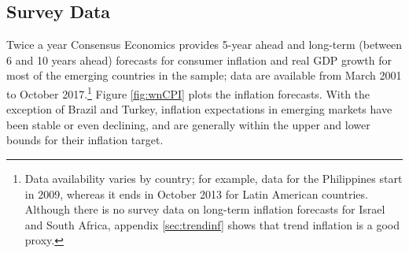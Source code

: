 {\subsection{Survey Data} \label{sec:SurveyData}
\iftoggle{toclinks}{\gototoc}{} %

Twice a year Consensus Economics provides 5-year ahead and long-term (between 6 and 10 years ahead) forecasts for consumer inflation and real GDP growth for most of the emerging countries in the sample; data are available from March 2001 to October 2017.\footnote{ Data availability varies by country; for example, data for the Philippines start in 2009, whereas it ends in October 2013 for Latin American countries. Although there is no survey data on long-term inflation forecasts for Israel and South Africa, appendix \ref{sec:trendinf} shows that trend inflation is a good proxy.}
Figure \ref{fig:wnCPI} plots the inflation forecasts. 
With the exception of Brazil and Turkey, inflation expectations in emerging markets have been stable or even declining, and are generally within the upper and lower bounds for their inflation target.



}
